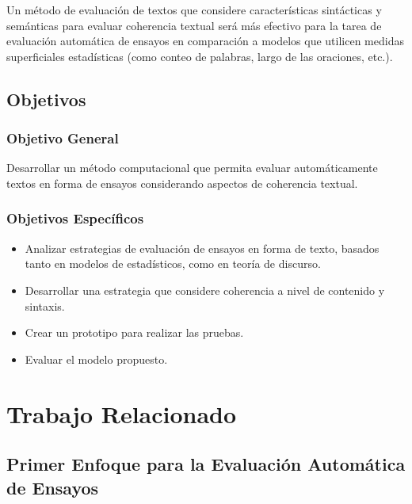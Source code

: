\documentclass[12pt]{diicc}
\begin{document}
Un método de evaluación de textos que considere características sintácticas y semánticas para evaluar coherencia textual será más efectivo para la tarea de evaluación automática de ensayos en comparación a modelos que utilicen medidas superficiales estadísticas (como conteo de palabras, largo de las oraciones, etc.).

\section{Objetivos}
	\subsection{Objetivo General}
		Desarrollar un método computacional que permita evaluar automáticamente textos en forma de ensayos considerando aspectos de coherencia textual.

	\subsection{Objetivos Específicos}

	\begin{itemize}
		\item Analizar estrategias de evaluación de ensayos en forma de texto, basados tanto en modelos de estadísticos, como en teoría de discurso.
		\item Desarrollar una estrategia que considere coherencia a nivel de contenido y sintaxis.
		\item Crear un prototipo para realizar las pruebas.
		\item Evaluar el modelo propuesto.
	\end{itemize}
	

%
% 
\chapter{Trabajo Relacionado}\label{chap:background}

\section{Primer Enfoque para la Evaluación Automática de Ensayos}
\end{document}
